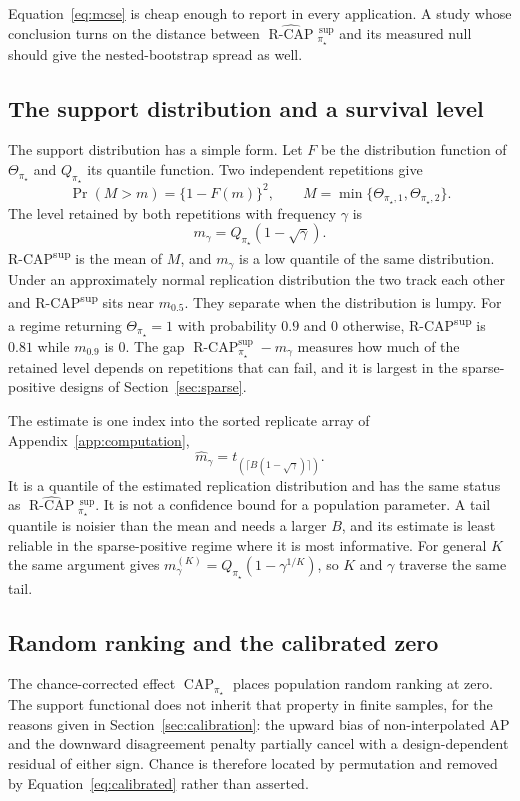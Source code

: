 \documentclass[11pt]{article}
\newcommand{\CAP}{\operatorname{CAP}}
\newcommand{\Tpi}{\CAP_{\pi_\star}}
\newcommand{\RCAP}{\operatorname{R\text{-}CAP}^{\mathrm{sup}}_{\pi_\star}}
\newcommand{\RCAPHat}{\widehat{\operatorname{R\text{-}CAP}}{}^{\,\mathrm{sup}}_{\pi_\star}}
\theoremstyle{remark}
\begin{document}
Equation~\eqref{eq:mcse} is cheap enough to report in every application. A study whose conclusion turns on the distance between $\RCAPHat$ and its measured null should give the nested-bootstrap spread as well.

\subsection{The support distribution and a survival level}
\label{sec:survival}

The support distribution has a simple form. Let $F$ be the distribution function of $\Theta_{\pi_\star}$ and $Q_{\pi_\star}$ its quantile function. Two independent repetitions give
\[
\Pr(M>m)=\{1-F(m)\}^2,
\qquad
M=\min\{\Theta_{\pi_\star,1},\Theta_{\pi_\star,2}\}.
\]
The level retained by both repetitions with frequency $\gamma$ is
\begin{equation}
m_\gamma=Q_{\pi_\star}(1-\sqrt{\gamma}).
\label{eq:survival-level}
\end{equation}
R-CAP\textsuperscript{sup} is the mean of $M$, and $m_\gamma$ is a low quantile of the same distribution. Under an approximately normal replication distribution the two track each other and R-CAP\textsuperscript{sup} sits near $m_{0.5}$. They separate when the distribution is lumpy. For a regime returning $\Theta_{\pi_\star}=1$ with probability $0.9$ and $0$ otherwise, R-CAP\textsuperscript{sup} is $0.81$ while $m_{0.9}$ is $0$. The gap $\RCAP-m_\gamma$ measures how much of the retained level depends on repetitions that can fail, and it is largest in the sparse-positive designs of Section~\ref{sec:sparse}.

The estimate is one index into the sorted replicate array of Appendix~\ref{app:computation},
\[
\widehat m_\gamma=t_{(\lceil B(1-\sqrt{\gamma})\rceil)}.
\]
It is a quantile of the estimated replication distribution and has the same status as $\RCAPHat$. It is not a confidence bound for a population parameter. A tail quantile is noisier than the mean and needs a larger $B$, and its estimate is least reliable in the sparse-positive regime where it is most informative. For general $K$ the same argument gives $m_\gamma^{(K)}=Q_{\pi_\star}(1-\gamma^{1/K})$, so $K$ and $\gamma$ traverse the same tail.

\subsection{Random ranking and the calibrated zero}

The chance-corrected effect $\Tpi$ places population random ranking at zero. The support functional does not inherit that property in finite samples, for the reasons given in Section~\ref{sec:calibration}: the upward bias of non-interpolated AP and the downward disagreement penalty partially cancel with a design-dependent residual of either sign. Chance is therefore located by permutation and removed by Equation~\eqref{eq:calibrated} rather than asserted.
\end{document}
